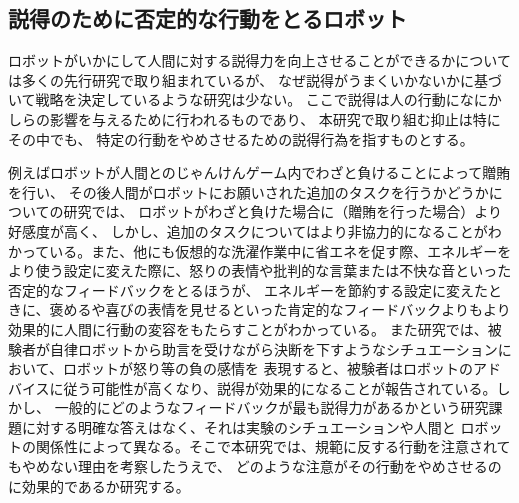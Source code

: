 \documentclass{kuisthesis}
\begin{document}
\subsection{説得のために否定的な行動をとるロボット}

ロボットがいかにして人間に対する説得力を向上させることができるかについては多くの先行研究で取り組まれているが、
なぜ説得がうまくいかないかに基づいて戦略を決定しているような研究は少ない。
ここで説得は人の行動になにかしらの影響を与えるために行われるものであり、
本研究で取り組む抑止は特にその中でも、
特定の行動をやめさせるための説得行為を指すものとする。

例えばロボットが人間とのじゃんけんゲーム内でわざと負けることによって贈賄を行い、
その後人間がロボットにお願いされた追加のタスクを行うかどうかについての研究\cite{sandoval2016can}では、
ロボットがわざと負けた場合に（贈賄を行った場合）より好感度が高く、
しかし、追加のタスクについてはより非協力的になることがわかっている。また、他にも仮想的な洗濯作業中に省エネを促す際、エネルギーをより使う設定に変えた際に、怒りの表情や批判的な言葉または不快な音といった否定的なフィードバックをとるほうが、
エネルギーを節約する設定に変えたときに、褒めるや喜びの表情を見せるといった肯定的なフィードバックよりもより効果的に人間に行動の変容をもたらすことがわかっている\cite{Midden2009}。
また研究\cite{paradeda2019makes}では、被験者が自律ロボットから助言を受けながら決断を下すようなシチュエーションにおいて、ロボットが怒り等の負の感情を
表現すると、被験者はロボットのアドバイスに従う可能性が高くなり、説得が効果的になることが報告されている。しかし、
一般的にどのようなフィードバックが最も説得力があるかという研究課題に対する明確な答えはなく、それは実験のシチュエーションや人間と
ロボットの関係性によって異なる。そこで本研究では、規範に反する行動を注意されてもやめない理由を考察したうえで、
どのような注意がその行動をやめさせるのに効果的であるか研究する。
\end{document}
